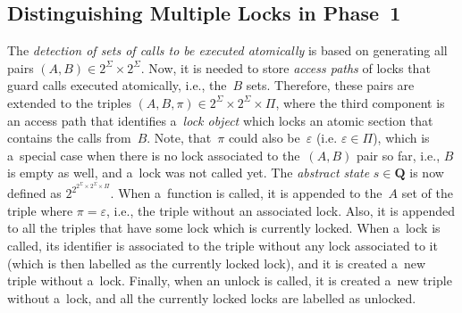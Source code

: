 \subsection{Distinguishing Multiple Locks in Phase~1}
\label{sec:proposalMultiLocksPhase1}

The \emph{detection of sets of calls to be executed atomically} is based on
generating all pairs $ {(A, B)} \in 2^\Sigma \times 2^\Sigma $. Now, it is
needed to store \emph{access paths} of locks that guard calls
executed atomically, i.e., the~$ B $ sets. Therefore, these pairs are
extended to the triples $ {(A, B, \pi)} \in 2^\Sigma \times 2^\Sigma \times
\Pi $, where the third component is an access path that identifies
a~\emph{lock object} which locks an atomic section that contains the calls
from~$ B $. Note, that~$ \pi $ could also be~$ \varepsilon $ (i.e.
$ \varepsilon \in \Pi $), which is a~special case when there is no lock
associated to the~${ (A, B) }$ pair so far, i.e., $ B $ is empty as well,
and a~lock was not called yet. The \emph{abstract state} $ s \in
\boldsymbol{Q} $ is now defined as $ 2^{2^{2^\Sigma \times 2^\Sigma \times
\Pi}} $. When a~function is called, it is appended to the~$ A $
set of the triple where $ \pi = \varepsilon $, i.e., the triple without
an associated lock. Also, it is appended to all the triples that have
some lock which is currently locked. When a~lock is called, its identifier
is associated to the triple without any lock associated to it (which is
then labelled as the currently locked lock), and it is created a~new triple
without a~lock. Finally, when an unlock is called, it is created a~new
triple without a~lock, and all the currently locked locks are labelled
as unlocked.

